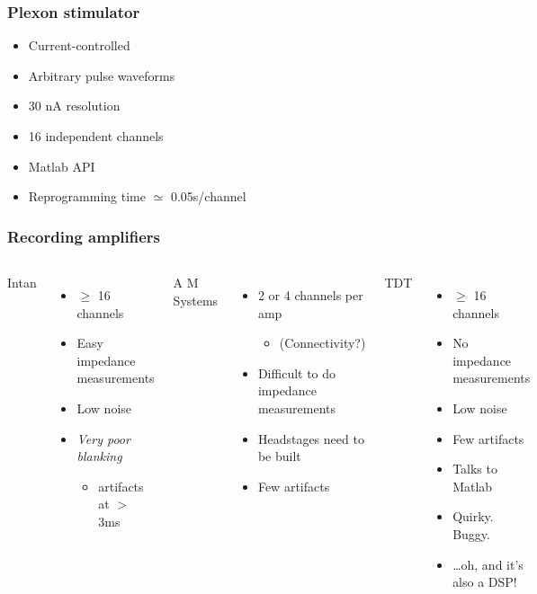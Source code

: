 \documentclass{beamer}
\begin{document}
\begin{frame}
  \frametitle{Plexon stimulator}
  \begin{itemize}
    \item Current-controlled
    \item Arbitrary pulse waveforms
    \item 30 nA resolution
    \item 16 independent channels
    \item Matlab API
    \item Reprogramming time $\simeq$ 0.05s/channel
  \end{itemize}
\end{frame}
    

\begin{frame}
  \frametitle{Recording amplifiers}
  \begin{columns}
    \column{33mm}
    Intan
    \begin{itemize}
      \item $\geq$ 16 channels
      \item Easy impedance measurements
      \item Low noise
      \item {\it Very poor blanking}
        \begin{itemize}
        \item artifacts at $>$ 3ms
        \end{itemize}
    \end{itemize}
    \column{33mm}
    A M Systems
    \begin{itemize}
      \item 2 or 4 channels per amp
        \begin{itemize}
          \item (Connectivity?)
        \end{itemize}
      \item Difficult to do impedance measurements
      \item Headstages need to be built
      \item Few artifacts
    \end{itemize}
    \column{33mm}
    TDT
    \begin{itemize}
      \item $\geq$ 16 channels
      \item No impedance measurements
      \item Low noise
      \item Few artifacts
      \item Talks to Matlab
      \item Quirky.  Buggy.
      \item \dots oh, and it's also a DSP!
    \end{itemize}
  \end{columns}
\end{frame}
\end{document}
